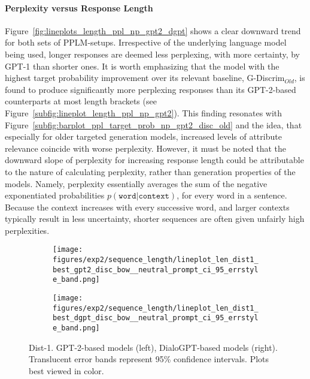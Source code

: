 \paragraph{Perplexity versus Response Length} Figure~\ref{fig:lineplots_length_ppl_np_gpt2_dgpt} shows a clear downward trend for both sets of PPLM-setups. Irrespective of the underlying language model being used, longer responses are deemed less perplexing, with more certainty, by GPT-1 than shorter ones. It is worth emphasizing that the model with the highest target probability improvement over its relevant baseline, G-Discrim$_{Old}$, is found to produce significantly more perplexing responses than its GPT-2-based counterparts at most length brackets (see Figure~\ref{subfig:lineplot_length_ppl_np_gpt2}). This finding resonates with Figure~\ref{subfig:barplot_ppl_target_prob_np_gpt2_disc_old} and the idea, that especially for older targeted generation models, increased levels of attribute relevance coincide with worse perplexity.
However, it must be noted that the downward slope of perplexity for increasing response length could be attributable to the nature of calculating perplexity, rather than generation properties of the models. Namely, perplexity essentially averages the sum of the negative exponentiated probabilities $p(\texttt{word} | \texttt{context})$, for every word in a sentence. Because the context increases with every successive word, and larger contexts typically result in less uncertainty, shorter sequences are often given unfairly high perplexities.

\begin{figure}[H]
     \centering
     \begin{subfigure}[b]{0.49\textwidth}
        \centering
\texttt{[image: figures/exp2/sequence\_length/lineplot\_len\_dist1\_best\_gpt2\_disc\_bow\_\_neutral\_prompt\_ci\_95\_errstyle\_band.png]}
        \caption{}
        \label{subfig:lineplot_length_dist1_np_gpt2}
     \end{subfigure}
     \hfill
     \begin{subfigure}[b]{0.49\textwidth}
        \centering
        \texttt{[image: figures/exp2/sequence\_length/lineplot\_len\_dist1\_best\_dgpt\_disc\_bow\_\_neutral\_prompt\_ci\_95\_errstyle\_band.png]}
        \caption{}
        \label{subfig:lineplot_length_dist1_np_dgpt}
     \end{subfigure}
        \caption{Dist-1. GPT-2-based models (left), DialoGPT-based models (right). Translucent error bands represent 95\% confidence intervals. Plots best viewed in color.}
        \label{fig:lineplots_length_dist1_np_gpt2_dgpt}
\end{figure}

